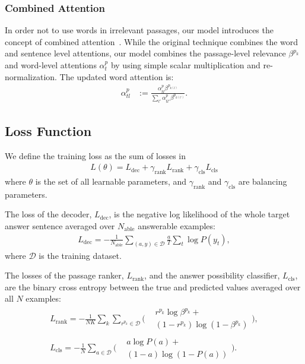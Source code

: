 \documentclass[11pt,a4paper]{article}
\theoremstyle{mydef}
\theoremstyle{myprob}
\begin{document}
\subsubsection{Combined Attention}
\label{sec:combined}

In order not to use words in irrelevant passages, our model introduces the concept of combined attention~\citep{SunHLLMT18}. While the original technique combines the word and sentence level attentions, our model combines the passage-level relevance $\beta^{p_k}$ and word-level attentions $\alpha^p_t$ by using simple scalar multiplication and re-normalization. The updated word attention is:
\begin{align}
\alpha^p_{tl} & := \frac{\alpha^p_{tl} \beta^{p_{k(l)} }}{\sum_{l'} \alpha^p_{tl'} \beta^{p_{k(l')}}}.
\end{align}


\subsection{Loss Function}

We define the training loss as the sum of losses in 
\begin{align}
L(\theta) = L_\mathrm{dec} + \gamma_\mathrm{rank} L_\mathrm{rank} + \gamma_\mathrm{cls} L_\mathrm{cls}
\end{align}
where $\theta$ is the set of all learnable parameters, and $\gamma_\mathrm{rank}$ and $\gamma_\mathrm{cls}$ are balancing parameters.

The loss of the decoder, $L_\mathrm{dec}$, is the negative log likelihood of the whole target answer sentence averaged over $N_\mathrm{able}$ answerable examples:
\begin{align}
L_\mathrm{dec} = - \frac{1}{N_\mathrm{able}}\sum_{(a,y)\in \mathcal{D}} \frac{a}{T} \sum_t \log P(y_{t}),
\end{align}
where $\mathcal{D}$ is the training dataset.


The losses of the passage ranker, $L_\mathrm{rank}$, and
the answer possibility classifier, $L_\mathrm{cls}$, are
the binary cross entropy between the true and predicted values averaged over all $N$ examples:
\begingroup\makeatletter\def\f@size{9.5}\check@mathfonts
\begin{gather}
L_\mathrm{rank} = -  \frac{1}{NK} \sum_k \sum_{r^{p_k}\in\mathcal{D}}  
\biggl(
\begin{split}
&r^{p_k} \log \beta^{p_k} +  \\
&(1-r^{p_k}) \log (1-\beta^{p_k}) 
\end{split}
\biggr),\\
L_\mathrm{cls} = - \frac{1}{N} \sum_{a \in \mathcal{D}} 
\biggl(
\begin{split}
&a \log P(a) + \\
&(1-a) \log (1-P(a)) 
\end{split}
\biggr).
\end{gather}
\endgroup
\end{document}
